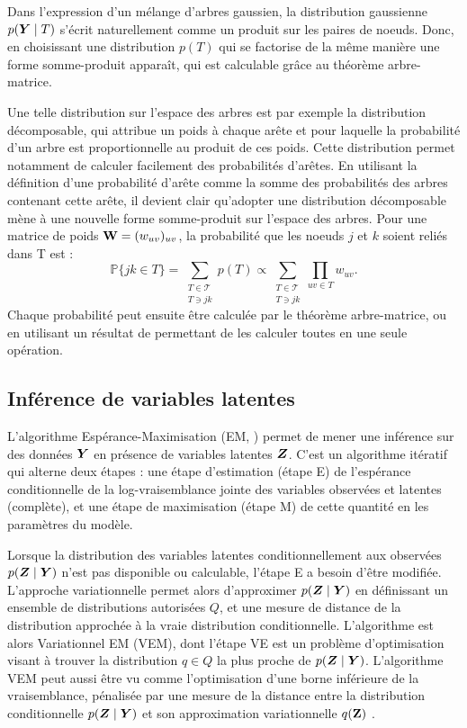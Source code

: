 Dans l'expression d'un mélange d'arbres gaussien, la distribution gaussienne $p({\boldsymbol{Y}}\mid T)$ s'écrit naturellement comme un produit sur les paires de noeuds. Donc, en choisissant une distribution $p(T)$ qui se factorise de la même manière une forme somme-produit apparaît, qui est calculable grâce au théorème arbre-matrice.

 Une telle distribution sur l'espace des arbres est par exemple la distribution décomposable, qui attribue un poids à chaque arête et pour laquelle la probabilité d'un arbre est proportionnelle au produit de ces poids. Cette distribution permet notamment de calculer facilement des probabilités d'arêtes. En utilisant la définition d'une probabilité d'arête comme la somme des probabilités des arbres contenant cette arête, il devient clair qu'adopter une distribution décomposable mène à une nouvelle forme somme-produit sur l'espace des arbres. Pour une matrice de poids ${\bf W}=(w_{uv})_{uv}$, la probabilité que les noeuds $j$ et $k$ soient reliés dans T est :
$$\mathds{P}\{jk\in T\} = \sum_{\substack{T\in \mathcal{T} \\ T\ni jk}} p(T) \propto \sum_{\substack{T\in \mathcal{T} \\ T\ni jk}} \prod_{uv \in T} w_{uv}.$$
Chaque probabilité peut ensuite être calculée par le théorème arbre-matrice, ou en utilisant un résultat de \citet{kirshner} permettant de les calculer toutes en une seule opération.

 
\subsection*{Inférence de variables latentes}
L'algorithme Espérance-Maximisation (EM, \citet{DLR77}) permet de mener une inférence sur des données ${\boldsymbol{Y}}$ en présence de variables latentes ${\boldsymbol{Z}}$. C'est un algorithme itératif qui alterne deux étapes : une étape d'estimation (étape E) de l'espérance conditionnelle de la log-vraisemblance jointe des variables observées et latentes (complète), et une étape de maximisation (étape M) de cette quantité en les paramètres du modèle.

Lorsque la distribution des variables latentes conditionnellement aux observées $p({\boldsymbol{Z}}\mid{\boldsymbol{Y}})$ n'est pas disponible ou calculable, l'étape E a besoin d'être modifiée. L'approche variationnelle permet alors d'approximer $p({\boldsymbol{Z}}\mid{\boldsymbol{Y}})$ en définissant un ensemble de distributions autorisées $Q$, et une mesure de distance de la distribution approchée à la vraie distribution conditionnelle. L'algorithme est alors Variationnel EM (VEM), dont l'étape VE est un problème d'optimisation visant à trouver la distribution $q\in Q$ la plus proche de $p({\boldsymbol{Z}}\mid{\boldsymbol{Y}})$. L'algorithme VEM peut aussi être vu comme l'optimisation d'une borne inférieure de la vraisemblance, pénalisée par une mesure de la distance entre la distribution conditionnelle $p({\boldsymbol{Z}}\mid{\boldsymbol{Y}})$ et son approximation variationnelle $q({\bf Z})$ .\\


